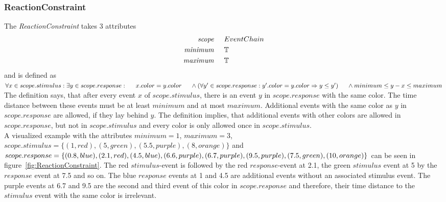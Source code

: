 	\subsubsection{ReactionConstraint}
		The \emph{ReactionConstraint} takes 3 attributes
		\begin{align*}
			\emph{scope} 	& \hspace{.5cm} EventChain\\
			\emph{minimum}	& \hspace{.5cm} \mathbb{T}\\
			\emph{maximum}	& \hspace{.5cm} \mathbb{T}
		\end{align*}
		and is defined as \\[10pt]
		\begin{math}
			\forall x\in scope.stimulus: \exists y\in scope.response:\\
			\text{\hspace{.5cm}}x.color=y.color\\
			\text{\hspace{.5cm}}\land (\forall y'\in scope.response: y'.color=y.color\Rightarrow y\leq y')\\
			\text{\hspace{.5cm}}\land minimum \leq y-x \leq maximum
		\end{math}\\[10pt]
		The definition says, that after every event $x$ of $scope.stimulus$, there is an event $y$ in $scope.response$ with the same color. The time distance between these events must be at least $minimum$ and at most $maximum$. Additional events with the same color as $y$ in $scope.response$ are allowed, if they lay behind $y$.  The definition implies, that additional events with other colors are allowed in $scope.response$, but not in $scope.stimulus$ and every color is only allowed once in $scope.stimulus$.\\
		A visualized example with the attributes $minimum=1$, $maximum=3$,\\
		$scope.stimulus=\{(1, red), (5, green), (5.5, purple), (8, orange)\}$ and $scope.response=\{(0.8, blue), (2.1, red), (4.5, blue), (6.6, purple),
		(6.7, purple), (9.5, purple), (7.5, green), \\
		(10, orange)\}$ can be seen in figure~\ref{fig:ReactionConstraint}. The red $stimulus$-event is followed by the red $response$-event at 2.1, the green $stimulus$ event at 5 by the $response$ event at 7.5 and so on. The blue $response$ events at 1 and 4.5 are additional events without an associated stimulus event. The purple events at 6.7 and 9.5 are the second and third event of this color in $scope.response$ and therefore, their time distance to the $stimulus$ event with the same color is irrelevant.
